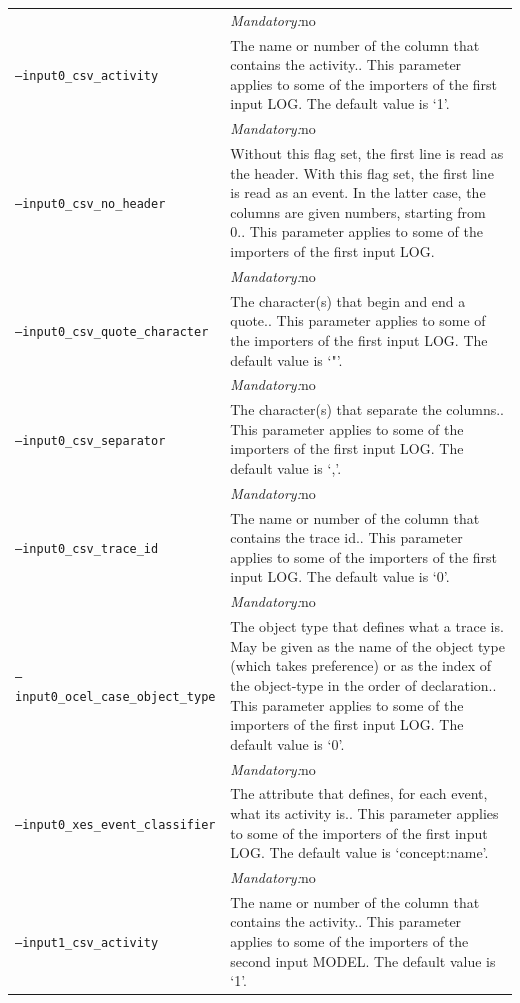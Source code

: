 {\begin{tabularx}{\linewidth}{lX}
&\textit{Mandatory:}\quad no\\
\texttt{--input0\_csv\_activity} & The name or number of the column that contains the activity.. This parameter applies to some of the importers of the first input LOG. The default value is `1'.\\
&\textit{Mandatory:}\quad no\\
\texttt{--input0\_csv\_no\_header} & Without this flag set, the first line is read as the header. 
    With this flag set, the first line is read as an event. In the latter case, the columns are given numbers, starting from 0.. This parameter applies to some of the importers of the first input LOG. \\
&\textit{Mandatory:}\quad no\\
\texttt{--input0\_csv\_quote\_character} & The character(s) that begin and end a quote.. This parameter applies to some of the importers of the first input LOG. The default value is `"'.\\
&\textit{Mandatory:}\quad no\\
\texttt{--input0\_csv\_separator} & The character(s) that separate the columns.. This parameter applies to some of the importers of the first input LOG. The default value is `,'.\\
&\textit{Mandatory:}\quad no\\
\texttt{--input0\_csv\_trace\_id} & The name or number of the column that contains the trace id.. This parameter applies to some of the importers of the first input LOG. The default value is `0'.\\
&\textit{Mandatory:}\quad no\\
\texttt{--input0\_ocel\_case\_object\_type} & The object type that defines what a trace is. May be given as the name of the object type (which takes preference) or as the index of the object-type in the order of declaration.. This parameter applies to some of the importers of the first input LOG. The default value is `0'.\\
&\textit{Mandatory:}\quad no\\
\texttt{--input0\_xes\_event\_classifier} & The attribute that defines, for each event, what its activity is.. This parameter applies to some of the importers of the first input LOG. The default value is `concept:name'.\\
&\textit{Mandatory:}\quad no\\
\texttt{--input1\_csv\_activity} & The name or number of the column that contains the activity.. This parameter applies to some of the importers of the second input MODEL. The default value is `1'.\\

\end{tabularx}}
